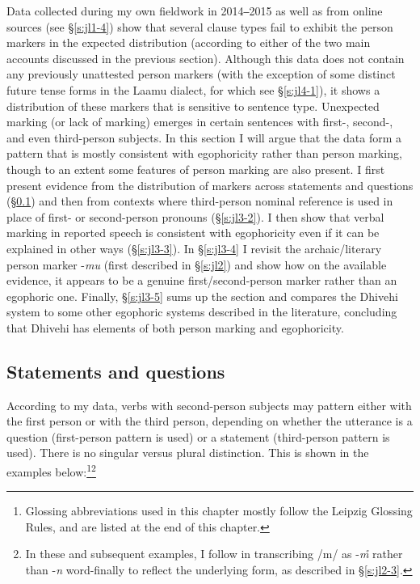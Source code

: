 \documentclass[output=paper]{langsci/langscibook}
\begin{document}
Data collected during my own fieldwork in 2014‒2015 as well as from online sources (see §‎\ref{s:jl1-4}) show that several clause types fail to exhibit the person markers in the expected distribution (according to either of the two main accounts discussed in the previous section). Although this data does not contain any previously unattested person markers (with the exception of some distinct future tense forms in the Laamu dialect, for which see §\ref{s:jl4-1}), it shows a distribution of these markers that is sensitive to sentence type. Unexpected marking (or lack of marking) emerges in certain sentences with first-, second-, and even third-person subjects. In this section I will argue that the data form a pattern that is mostly consistent with egophoricity rather than person marking, though to an extent some features of person marking are also present. I first present evidence from the distribution of markers across statements and questions (§‎\ref{s:jl3-1}) and then from contexts where third-person nominal reference is used in place of first- or second-person pronouns (§\ref{s:jl3-2}‎). I then show that verbal marking in reported speech is consistent with egophoricity even if it can be explained in other ways (§‎\ref{s:jl3-3}). In §\ref{s:jl3-4}‎ I revisit the archaic/literary person marker -\textit{mu} (first described in §\ref{s:jl2}‎) and show how on the available evidence, it appears to be a genuine first/second-person marker rather than an egophoric one. Finally, §\ref{s:jl3-5}‎ sums up the section and compares the Dhivehi system to some other egophoric systems described in the literature, concluding that Dhivehi has elements of both person marking and egophoricity.


\subsection{Statements and questions}\label{s:jl3-1}

According to my data, verbs with second-person subjects may pattern either with the first person or with the third person, depending on whether the utterance is a question (first-person pattern is used) or a statement (third-person pattern is used). There is no singular versus plural distinction. This is shown in the examples below:\footnote{Glossing abbreviations used in this chapter mostly follow the Leipzig Glossing Rules, and are listed at the end of this chapter.}\footnote{In these and subsequent examples, I follow \cite{Gnanadesikan2017} in transcribing /m/ as -\textit{m̊} rather than -\textit{n} word-finally to reflect the underlying form, as described in §‎\ref{s:jl2-3}.}
\end{document}
